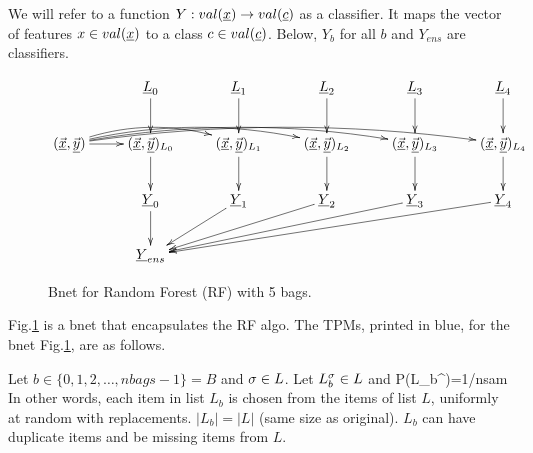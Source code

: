 We will refer to a function
$Y:val(\rvx) \rarrow val(\rvc)$
as a
classifier. It maps the vector of features $x\in val(\rvx)$
to a class $c\in val(\rvc)$. Below,
$Y_b$ for all $b$
and $Y_{ens}$
are classifiers.


\begin{figure}
$$
\xymatrix{
&
\rvL_0\ar[d]
&
\rvL_1\ar[d]
&
\rvL_2\ar[d]
&
\rvL_3\ar[d]
&
\rvL_4\ar[d]
\\
(\vec{\rvx},\vec{\rvy})
\ar[r]
\ar@/^1pc/[rr]
\ar@/^1pc/[rrr]
\ar@/^1pc/[rrrr]
\ar@/^1pc/[rrrrr]
&
(\vec{\rvx},\vec{\rvy})_{L_0}\ar[d]
&
(\vec{\rvx},\vec{\rvy})_{L_1}\ar[d]
&
(\vec{\rvx},\vec{\rvy})_{L_2}\ar[d]
&
(\vec{\rvx},\vec{\rvy})_{L_3}\ar[d]
&
(\vec{\rvx},\vec{\rvy})_{L_4}\ar[d]
\\
&
\rvY_0\ar[d]
&
\rvY_1\ar[dl]
&
\rvY_2\ar[dll]
&
\rvY_3\ar[dlll]
&
\rvY_4\ar[dllll]
\\
&
\rvY_{ens}
}
$$
\caption{Bnet for Random Forest (RF)
with 5 bags.}
\label{fig-rf-5-bags}
\end{figure}

Fig.\ref{fig-rf-5-bags}
is a bnet that encapsulates the RF algo.
The TPMs, printed in blue, for the
bnet Fig.\ref{fig-rf-5-bags},
are as follows.


Let $b\in\{0, 1, 2, \ldots, nbags-1\}=B$
and $\sigma\in L$. Let $L^\sigma_b\in L$ and
\beq\color{blue}
P(L_b^\s)=1/nsam
\eeq
In other words, each item in list $L_b$ 
is chosen from the items of list $L$, uniformly at random
with replacements.
 $|L_b|=|L|$ (same size as original).
$L_b$ can have duplicate items and be missing
items from $L$.


